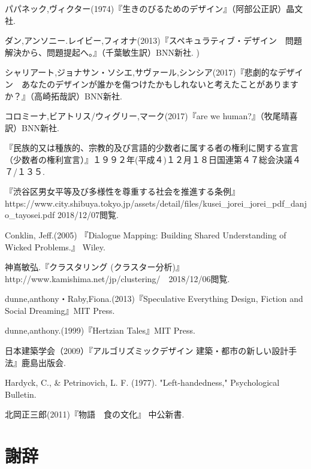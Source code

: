 \documentclass{jsarticle}
\begin{document}
\newpage
\begin{thebibliography}{99}

  パパネック,ヴィクター(1974)『生きのびるためのデザイン』（阿部公正訳）晶文社.

  ダン,アンソニー.レイビー,フィオナ(2013)『スペキュラティブ・デザイン　問題解決から、問題提起へ。』（千葉敏生訳）BNN新社.
  )

  シャリアート,ジョナサン・ソシエ,サヴァール,シンシア(2017)『悲劇的なデザイン　あなたのデザインが誰かを傷つけたかもしれないと考えたことがありますか？』（高崎拓哉訳）BNN新社.

  コロミーナ,ビアトリス/ウィグリー,マーク(2017)『are we human?』（牧尾晴喜訳）BNN新社.

  『民族的又は種族的、宗教的及び言語的少数者に属する者の権利に関する宣言（少数者の権利宣言）』１９９２年(平成４)１２月１８日国連第４７総会決議４７/１３５.

  『渋谷区男女平等及び多様性を尊重する社会を推進する条例』
  https://www.city.shibuya.tokyo.jp/assets/detail/files/kusei\_jorei\_jorei\_pdf\_danjo\_tayosei.pdf
2018/12/07閲覧.

  Conklin, Jeff.(2005) 『Dialogue Mapping: Building Shared Understanding of Wicked Problems.』 Wiley.


  神嶌敏弘.『クラスタリング (クラスター分析)』 http://www.kamishima.net/jp/clustering/　2018/12/06閲覧.


  dunne,anthony・Raby,Fiona.(2013)『Speculative Everything Design, Fiction and Social Dreaming』MIT Press.

  dunne,anthony.(1999)『Hertzian Tales』MIT Press.

  日本建築学会（2009）『アルゴリズミックデザイン 建築・都市の新しい設計手法』鹿島出版会.

  Hardyck, C., & Petrinovich, L. F. (1977). "Left-handedness," Psychological Bulletin.

  北岡正三郎(2011)『物語　食の文化』 中公新書.

\end{thebibliography}

\newpage
\section*{謝辞}
\end{document}
